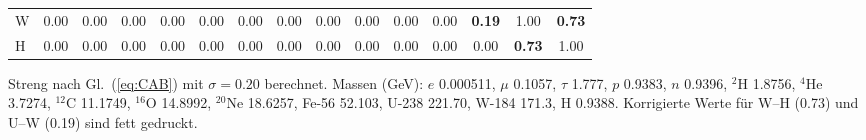 \documentclass[11pt,a4paper]{article}
\begin{document}
\begin{table}[H]
\begin{tabular}{l c c c c c c c c c c c c c c}
			W & 0.00 & 0.00 & 0.00 & 0.00 & 0.00 & 0.00 & 0.00 & 0.00 & 0.00 & 0.00 & 0.00 & \textbf{0.19} & 1.00 & \textbf{0.73} \\
			H & 0.00 & 0.00 & 0.00 & 0.00 & 0.00 & 0.00 & 0.00 & 0.00 & 0.00 & 0.00 & 0.00 & 0.00 & \textbf{0.73} & 1.00 \\
			\bottomrule
		\end{tabular}
		\par\smallskip
		\footnotesize Streng nach Gl.~(\ref{eq:CAB}) mit \(\sigma=0.20\) berechnet. Massen (GeV): \(e\) 0.000511, \(\mu\) 0.1057, \(\tau\) 1.777, \(p\) 0.9383, \(n\) 0.9396, \(^2\)H 1.8756, \(^4\)He 3.7274, \(^{12}\)C 11.1749, \(^{16}\)O 14.8992, \(^{20}\)Ne 18.6257, Fe-56 52.103, U-238 221.70, W-184 171.3, H 0.9388. Korrigierte Werte für W–H (0.73) und U–W (0.19) sind fett gedruckt.
	\end{table}
	
\end{document}
